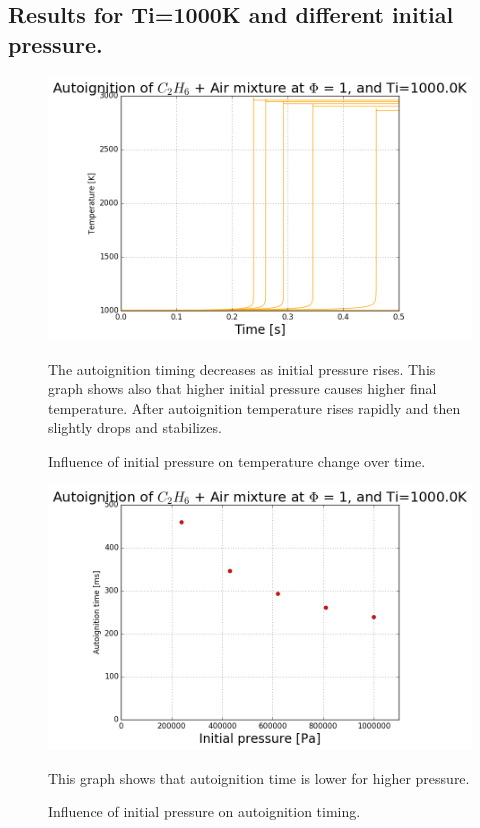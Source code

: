 \documentclass[11pt]{article}
\begin{document}
\subsection{Results for Ti=1000K and different initial pressure.}
\begin{figure} [H]
	\begin{center}
\includegraphics[height=0.5\textwidth]{T5_T_Trange_UV}
        \caption{Influence of initial pressure on temperature change over time.}
    \end{center}
\normalsize
{The autoignition timing decreases as initial pressure rises. This graph shows also that higher initial pressure causes higher final temperature. After autoignition temperature rises rapidly and then slightly drops and stabilizes.}
\end{figure}

\begin{figure} [H]
	\begin{center}
    \includegraphics[height=0.5\textwidth]{T5_Autoignition}
        \caption{Influence of initial pressure on autoignition timing.}
    \end{center}
\normalsize
{This graph shows that autoignition time is lower for higher pressure.}
\end{figure}
\end{document}
